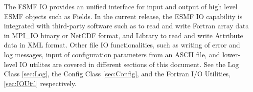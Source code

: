 

The ESMF IO provides an unified interface for input and output of
high level ESMF objects such as Fields.  In the current release, the ESMF IO 
capability is integrated with third-party software such as 
to read and write Fortran array data in MPI\_IO binary or NetCDF format, and 
Library to read and write Attribute data in XML format.  Other file IO
functionalities, such as writing of error and log messages, input of
configuration parameters from an ASCII file, and lower-level IO utilites are 
covered in different sections of this document.  See the Log Class 
\ref{sec:Log}, the Config Class \ref{sec:Config}, and the Fortran 
I/O Utilities, \ref{sec:IOUtil} respectively.


%
%


